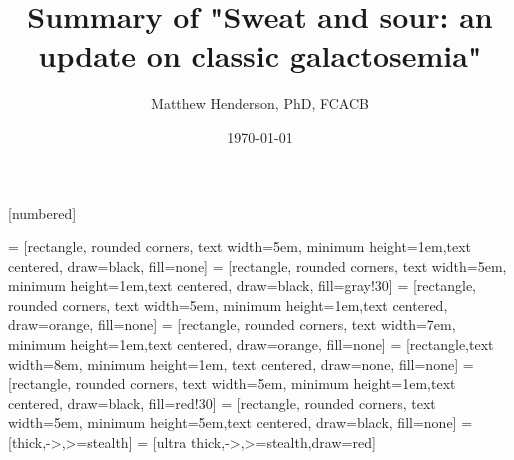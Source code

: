 \documentclass[presentation, smaller]{beamer}
\author{Matthew Henderson, PhD, FCACB}
\date{\today}
\title{Summary of "Sweat and sour: an update on classic galactosemia"}
\institute[NSO]{Newborn Screening Ontario}
\begin{document}
\maketitle


\vspace{220pt}
\beamertemplatenavigationsymbolsempty
{}[numbered]


 = [rectangle, rounded corners, text width=5em, minimum height=1em,text centered, draw=black, fill=none]
 = [rectangle, rounded corners, text width=5em, minimum height=1em,text centered, draw=black, fill=gray!30]
 = [rectangle, rounded corners, text width=5em, minimum height=1em,text centered, draw=orange, fill=none]
 = [rectangle, rounded corners, text width=7em, minimum height=1em,text centered, draw=orange, fill=none]
 = [rectangle,text width=8em, minimum height=1em, text centered, draw=none, fill=none]
 = [rectangle, rounded corners, text width=5em, minimum height=1em,text centered, draw=black, fill=red!30]
 = [rectangle, rounded corners, text width=5em, minimum height=5em,text centered, draw=black, fill=none]
 = [thick,->,>=stealth]
 = [ultra thick,->,>=stealth,draw=red]
\end{document}
